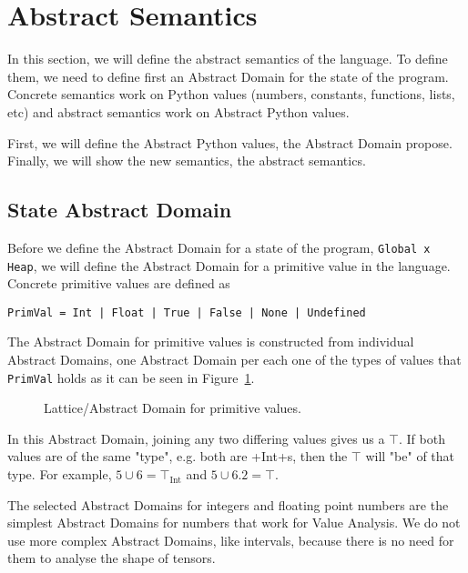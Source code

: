 \section{Abstract Semantics}

In this section, we will define the abstract semantics of the language. To define them, we
need to define first an Abstract Domain for the state of the program. Concrete semantics
work on Python values (numbers, constants, functions, lists, etc) and abstract semantics
work on Abstract Python values.

First, we will define the Abstract Python values, the Abstract Domain propose. Finally, we
will show the new semantics, the abstract semantics.

\subsection{State Abstract Domain}

Before we define the Abstract Domain for a state of the program, \verb+Global x Heap+, we
will define the Abstract Domain for a primitive value in the language. Concrete
primitive values are defined as

\begin{verbatim}
PrimVal = Int | Float | True | False | None | Undefined
\end{verbatim}

The Abstract Domain for primitive values is constructed from individual Abstract Domains,
one Abstract Domain per each one of the types of values that \verb+PrimVal+ holds as it
can be seen in Figure~\ref{latticevals}.

\begin{figure}
  \begin{center}
  
  \end{center}
  \caption{Lattice/Abstract Domain for primitive values.\label{latticevals}}
\end{figure}

In this Abstract Domain, joining any two differing values gives us a $\top$. If both
values are of the same "type", e.g. both are \pycode+Int+s, then the $\top$ will "be" of
that type. For example, $5 \cup 6 = \top_{\text{Int}}$ and $5 \cup 6.2 = \top$.

The selected Abstract Domains for integers and floating point numbers are the simplest
Abstract Domains for numbers that work for Value Analysis. We do not use more complex
Abstract Domains, like intervals, because there is no need for them to analyse the shape
of tensors.


